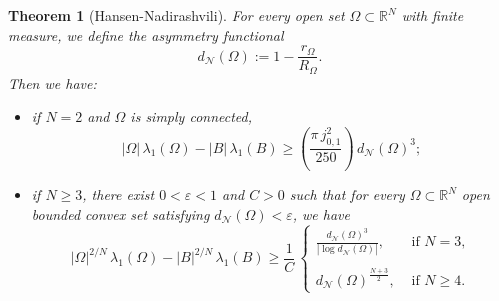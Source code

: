 \documentclass{amsart}
\newtheorem{theorem}[lemma]{Theorem}
\theoremstyle{definition}
\numberwithin{equation}{section}
\begin{document}
\begin{theorem}[Hansen-Nadirashvili]
\label{teo:HNoriginal}
For every open set $\Omega\subset\mathbb{R}^N$ with finite measure, we define the asymmetry functional
\begin{equation}
\label{d1}
d_\mathcal{N}(\Omega):=1-\frac{r_\Omega}{R_{\Omega}}.
\end{equation}
Then we have:
\begin{itemize}
\item if $N=2$ and $\Omega$ is simply connected,
\[
|\Omega|\,\lambda_1(\Omega)- |B|\,\lambda_1(B)\ge \left(\frac{\pi\,j_{0,1}^2}{250}\right)\,d_\mathcal{N}(\Omega)^3;
\]
\item if $N\ge 3$, there exist $0<\varepsilon<1$ and $C>0$ such that for every $\Omega\subset\mathbb{R}^N$ open bounded convex set satisfying $d_\mathcal{N}(\Omega)<\varepsilon$, we have
\[
|\Omega|^{2/N}\,\lambda_1(\Omega)- |B|^{2/N}\,\lambda_1(B)\ge \frac{1}{C}\,\left\{\begin{array}{cc}
\displaystyle\frac{d_\mathcal{N}(\Omega)^3}{|\log d_\mathcal{N}(\Omega)|}, & \mbox{ if } N=3,\\
&\\
d_\mathcal{N}(\Omega)^\frac{N+3}{2}, & \mbox{ if } N\ge 4.
\end{array}\right.
\]
\end{itemize}
\end{theorem}
\end{document}
